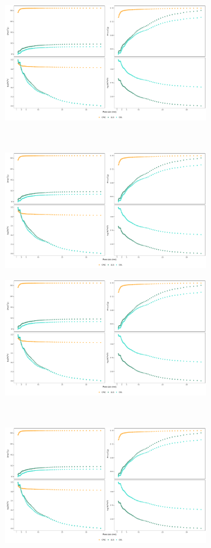 \begin{figure}[t!]
    \centering
    \begin{subfigure}[t]{0.5\textwidth}
        \centering
        \includegraphics[height=5cm]{R/figs/Kd_1ugL_SAN2.pdf}
        \caption{}
        \label{subfig:SAN2}
    \end{subfigure}%
    ~ 
    \begin{subfigure}[t]{0.5\textwidth}
        \centering
        \includegraphics[height=5cm]{R/figs/Kd_1ugL_SACO2.pdf}
        \caption{}
        \label{subfig:SACO2}
    \end{subfigure}
    \medskip
    \begin{subfigure}[t]{0.5\textwidth}
        \centering
        \includegraphics[height=5cm]{R/figs/Kd_1ugL_PVN2.pdf}
        \caption{}
        \label{subfig:PVN2}
    \end{subfigure}%
    ~ 
    \begin{subfigure}[t]{0.5\textwidth}
        \centering
        \includegraphics[height=5cm]{R/figs/Kd_1ugL_PVCO2.pdf}

\end{subfigure}
\end{figure}
